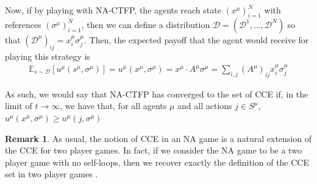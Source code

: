 \documentclass{article}
\theoremstyle{definition}
\newtheorem*{remark}{Remark}
\newcommand{\xmu}{x^{\mu}}
\newcommand{\refmu}{\sigma^{\mu}}
\begin{document}
  Now, if by playing with NA-CTFP, the
  agents reach state $(\xmu)_{i = 1}^N$ with references
  $(\refmu)_{i = 1}^N$, then we can define a distribution $\mathcal{D} =
  (\mathcal{D}^1, ..., \mathcal{D}^N)$ so that
  $(\mathcal{D}^\mu)_{ij} = \xmu_i \refmu_j$. Then, the expected
  payoff that the agent would receive for playing this strategy is
%
  \begin{align*}
    \mathbb{E}_{s \sim \mathcal{D}}[u^\mu (s^\mu, \refmu)] = u^\mu (\xmu, \refmu) = \xmu \cdot A^\mu \refmu = \sum_{i, j} (A^\mu)_{ij} \xmu_i \refmu_j \nonumber 
  \end{align*}

  As such, we would say that NA-CTFP has converged to the set of CCE if, in the limit of $t
  \rightarrow \infty$, we have that, for all agents $\mu$ and all actions $j \in S^\mu$,
  $u^\mu (\xmu, \refmu) \geq u^\mu(j, \refmu)$

  \begin{remark}
    As usual, the notion of CCE in an NA game is a natural extension of the CCE for two player
    games. In fact, if we consider the NA game to be a two player game with no self-loops, then
    we recover exactly the definition of the CCE set in two player games \cite{Ostrovski2014}.
  \end{remark}
\end{document}
